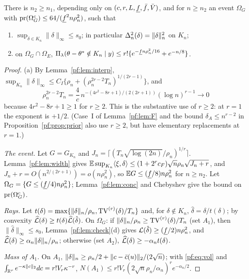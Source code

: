 \begin{proposition}[localization]\label{pf:prop:local}
There is $n_2\ge n_1$, depending only on $(c,r,L,\underline f,\bar f,\bar V)$, and for $n\ge n_2$ an event $\Omega_G$ with $\mathrm{pr}(\Omega_G^c)\le64/(\underline f^2n\rho_n^2)$, such that
\begin{enumerate}
\renewcommand{\labelenumi}{(\alph{enumi})}
\item $\sup_{\delta\in K_n}\|\delta\|_\infty\le s_0$; in particular $\Delta_n^2(\delta)=\|\delta\|_n^2$ on $K_n$;
\item on $\Omega_G\cap\Omega_E$, $\Pi_\lambda(\theta-\theta^{*}\notin K_n\mid y)\le r!\{e^{-\underline f n\rho_n^2/16}+e^{-n/8}\}$.
\end{enumerate}
\end{proposition}

\begin{proof}
(a) By Lemma~\ref{pf:lem:interp}, $\sup_{K_n}\|\delta\|_\infty\le C_I\{\rho_n+(\rho_n^{2r-2}T_n)^{1/(2r-1)}\}$, and
\[
\rho_n^{2r-2}T_n=\frac4c\,n^{-(4r^2-8r+1)/(2(2r+1))}(\log n)^{r-1}\to0
\]
because $4r^2-8r+1\ge1$ for $r\ge2$. This is the substantive use of $r\ge2$: at $r=1$ the exponent is $+1/2$. (Case~I of Lemma~\ref{pf:lem:F} and the bound $\delta_A\le n^{r-2}$ in Proposition~\ref{pf:prop:prior} also use $r\ge2$, but have elementary replacements at $r=1$.)

\emph{The event.} Let $G=G_{K_n}$ and $J_n=\lceil(T_n\sqrt{\log(2n)}/\rho_n)^{1/r}\rceil$. Lemma~\ref{pf:lem:width} gives $\mathbb{E}\sup_{K_n}\langle\xi,\delta\rangle\le(1+2^rc_F)\sqrt n\rho_n\sqrt{J_n+r}$, and $J_n+r=O(n^{2/(2r+1)})=o(n\rho_n^2)$, so $\mathbb{E} G\le(\underline f/8)n\rho_n^2$ for $n\ge n_2$. Let $\Omega_G=\{G\le(\underline f/4)n\rho_n^2\}$; Lemma~\ref{pf:lem:conc} and Chebyshev give the bound on $\mathrm{pr}(\Omega_G^c)$.

\emph{Rays.} Let $t(\delta)=\max\{\|\delta\|_n/\rho_n,\mathrm{TV}^{(r)}(\delta)/T_n\}$ and, for $\delta\notin K_n$, $\hat\delta=\delta/t(\delta)$; by convexity $\widehat{\mathcal L}(\delta)\ge t(\delta)\widehat{\mathcal L}(\hat\delta)$. On $\Omega_G$: if $\|\delta\|_n/\rho_n\ge\mathrm{TV}^{(r)}(\delta)/T_n$ (set $A_1$), then $\|\hat\delta\|_\infty\le s_0$, Lemma~\ref{pf:lem:check}(d) gives $\mathcal L(\hat\delta)\ge(\underline f/2)n\rho_n^2$, and $\widehat{\mathcal L}(\delta)\ge\alpha_n\|\delta\|_n/\rho_n$; otherwise (set $A_2$), $\widehat{\mathcal L}(\delta)\ge-\alpha_nt(\delta)$.

\emph{Mass of $A_1$.} On $A_1$, $\|\delta\|_n\ge\rho_n/2+\|c-\bar c(u)\|_2/(2\sqrt n)$; with \eqref{pf:eq:vol} and $\int_{\mathbb{R}^r}e^{-\kappa\|c\|_2}dc=r!V_r\kappa^{-r}$, $N(A_1)\le r!V_r(2\sqrt n\rho_n/\alpha_n)^re^{-\alpha_n/2}$.


\end{proof}
